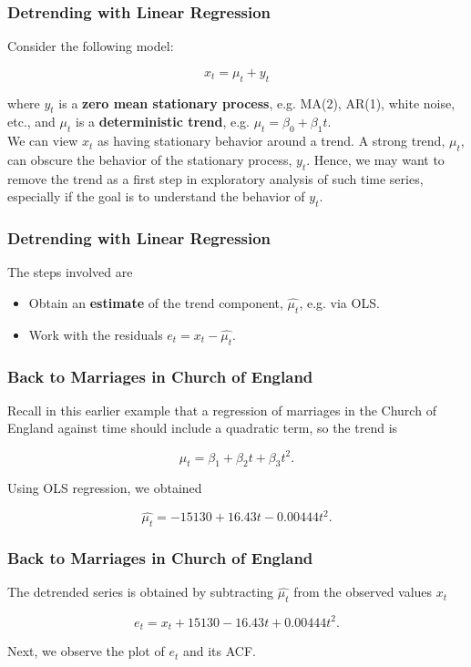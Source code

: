 \documentclass[%
xcolor=pdftex]{beamer}
\begin{document}
\begin{frame}
\frametitle{Detrending with Linear Regression}

Consider the following model:

\begin{equation} \label{eq:model}
x_t = \mu_t + y_t
\end{equation}

where $y_t$ is a \textbf{zero mean stationary process}, e.g. MA(2), AR(1), white noise, etc., and $\mu_t$ is a \textbf{deterministic trend}, e.g. $\mu_t = \beta_0 + \beta_1 t$.\\
\vspace{5mm}
We can view $x_t$ as having stationary behavior around a trend. A strong trend, $\mu_t$, can obscure the behavior of the stationary process, $y_t$. Hence, we may want to remove the trend as a first step in exploratory analysis of such time series, especially if the goal is to understand the behavior of $y_t$.

\end{frame}

\begin{frame}
\frametitle{Detrending with Linear Regression}

The steps involved are

\begin{itemize}
\item Obtain an \textbf{estimate} of the trend component, $\hat{\mu_t}$, e.g. via OLS.
\item Work with the residuals $e_t = x_t - \hat{\mu_t}$.
\end{itemize}

\end{frame}

\begin{frame}
\frametitle{Back to Marriages in Church of England}

Recall in this earlier example that a regression of marriages in the Church of England against time should include a quadratic term, so the trend is

$$
\mu_t = \beta_1 + \beta_2 t + \beta_3 t^2.
$$

Using OLS regression, we obtained

$$
\hat{\mu_t} = -15130 + 16.43 t - 0.00444 t^2.
$$

\end{frame}

\begin{frame}
\frametitle{Back to Marriages in Church of England}

The detrended series is obtained by subtracting $\hat{\mu_t}$ from the observed values $x_t$

$$
e_t = x_t + 15130 - 16.43 t + 0.00444 t^2.
$$

Next, we observe the plot of $e_t$ and its ACF.

\end{frame}
\end{document}

